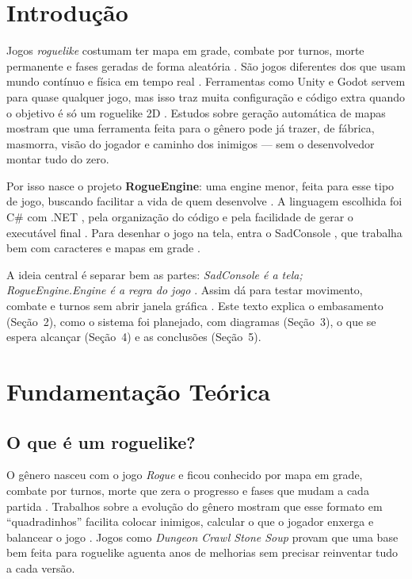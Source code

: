 \documentclass[12pt]{article}
\begin{document}
\section{Introdução}

Jogos \textit{roguelike} costumam ter mapa em grade, combate por turnos, morte permanente e
fases geradas de forma aleatória \citep{berlin2008,adams2014}. São jogos diferentes dos que
usam mundo contínuo e física em tempo real \citep{gregory2018}. Ferramentas como Unity e Godot
\citep{unity2024,godot2024} servem para quase qualquer jogo, mas isso traz muita configuração
e código extra quando o objetivo é só um roguelike 2D \citep{lewis2014,nystrom2014}. Estudos
sobre geração automática de mapas \citep{hendrikx2013,togelius2011,shaker2016} mostram que uma
ferramenta feita para o gênero pode já trazer, de fábrica, masmorra, visão do jogador e
caminho dos inimigos --- sem o desenvolvedor montar tudo do zero.

Por isso nasce o projeto \textbf{RogueEngine}: uma engine menor, feita para esse tipo de jogo,
buscando facilitar a vida de quem desenvolve \citep{craddock2015,wild2018,dcss2023}. A linguagem
escolhida foi C\# com .NET \citep{dotnet2024,pinheiro2020}, pela organização do código e pela
facilidade de gerar o executável final \citep{roslyn2024,netpublish2024}. Para desenhar o jogo
na tela, entra o SadConsole \citep{sadconsole2024,monogame2024}, que trabalha bem com
caracteres e mapas em grade \citep{berlin2008,browne2012}.

A ideia central é separar bem as partes: \textit{SadConsole é a tela; RogueEngine.Engine é a
regra do jogo} \citep{martin2017,fowler2002}. Assim dá para testar movimento, combate e turnos
sem abrir janela gráfica \citep{gregory2018,xunit2024}. Este texto explica o embasamento
(Seção~2), como o sistema foi planejado, com diagramas (Seção~3), o que se espera alcançar
(Seção~4) e as conclusões (Seção~5).

\section{Fundamentação Teórica}

\subsection{O que é um roguelike?}

O gênero nasceu com o jogo \textit{Rogue} e ficou conhecido por mapa em grade, combate por
turnos, morte que zera o progresso e fases que mudam a cada partida \citep{berlin2008,adams2014,
koster2004}. Trabalhos sobre a evolução do gênero \citep{browne2012,wild2018} mostram que esse
formato em ``quadradinhos'' facilita colocar inimigos, calcular o que o jogador enxerga e
balancear o jogo \citep{nystrom2014,buckland2005,tozour2002}. Jogos como \textit{Dungeon Crawl
Stone Soup} \citep{dcss2023} provam que uma base bem feita para roguelike aguenta anos de
melhorias sem precisar reinventar tudo a cada versão.
\end{document}
